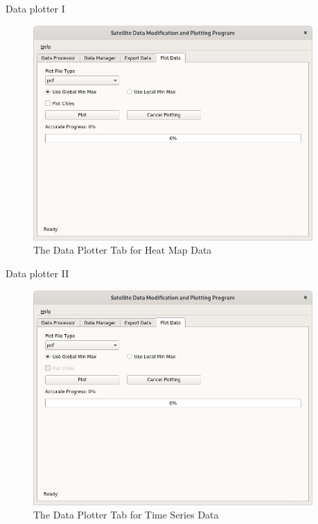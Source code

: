 \documentclass[
    hyperref={
        final,
        colorlinks=true,
        menucolor=black,
        anchorcolor=green,
        linkcolor=blue,
        citecolor=red,
        pdftitle={RS RAS Internship Presentation},
        pdfauthor={Moritz M. Konarski}
    }
]{beamer}
\begin{document}
\begin{frame}{Data plotter I}
\begin{figure}
    \includegraphics[width=0.95\textwidth]{../graphics/dpl01}
    \vspace{-8pt}
    \caption{The Data Plotter Tab for Heat Map Data}
\end{figure}
\end{frame}

\begin{frame}{Data plotter II}
\begin{figure}
    \includegraphics[width=0.95\textwidth]{../graphics/dpl02}
    \vspace{-8pt}
    \caption{The Data Plotter Tab for Time Series Data}
\end{figure}
\end{frame}
\end{document}
